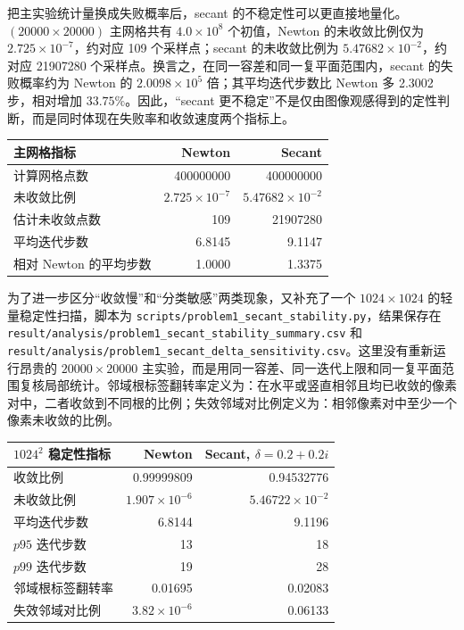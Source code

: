 \documentclass[12pt,a4paper,fontset=none]{ctexart}
\newcommand{\fileinline}[1]{{\urlstyle{same}\nolinkurl{#1}}}
\newcounter{none}
\newif\ifwidetable
\begin{document}
把主实验统计量换成失败概率后，secant 的不稳定性可以更直接地量化。\((20000\times 20000)\) 主网格共有 \(4.0\times 10^8\) 个初值，Newton 的未收敛比例仅为 \(2.725\times 10^{-7}\)，约对应 109 个采样点；secant 的未收敛比例为 \(5.47682\times 10^{-2}\)，约对应 21907280 个采样点。换言之，在同一容差和同一复平面范围内，secant 的失败概率约为 Newton 的 \(2.0098\times 10^5\) 倍；其平均迭代步数比 Newton 多 2.3002 步，相对增加 \(33.75\%\)。因此，``secant 更不稳定''不是仅由图像观感得到的定性判断，而是同时体现在失败率和收敛速度两个指标上。

{\def\LTcaptype{none} %
\begin{longtable}[]{@{}lrr@{}}
\toprule\noalign{}
主网格指标 & Newton & Secant \\
\midrule\noalign{}
\endhead
\bottomrule\noalign{}
\endlastfoot
计算网格点数 & 400000000 & 400000000 \\
未收敛比例 & \(2.725\times 10^{-7}\) & \(5.47682\times 10^{-2}\) \\
估计未收敛点数 & 109 & 21907280 \\
平均迭代步数 & 6.8145 & 9.1147 \\
相对 Newton 的平均步数 & 1.0000 & 1.3375 \\
\end{longtable}
}

为了进一步区分``收敛慢''和``分类敏感''两类现象，又补充了一个 \(1024\times 1024\) 的轻量稳定性扫描，脚本为 \fileinline{scripts/problem1_secant_stability.py}，结果保存在 \fileinline{result/analysis/problem1_secant_stability_summary.csv} 和 \fileinline{result/analysis/problem1_secant_delta_sensitivity.csv}。这里没有重新运行昂贵的 \(20000\times 20000\) 主实验，而是用同一容差、同一迭代上限和同一复平面范围复核局部统计。邻域根标签翻转率定义为：在水平或竖直相邻且均已收敛的像素对中，二者收敛到不同根的比例；失效邻域对比例定义为：相邻像素对中至少一个像素未收敛的比例。

{\def\LTcaptype{none} %
\widetabletrue
\begin{longtable}[]{@{}lrr@{}}
\toprule\noalign{}
\(1024^2\) 稳定性指标 & Newton & Secant, \(\delta=0.2+0.2i\) \\
\midrule\noalign{}
\endhead
\bottomrule\noalign{}
\endlastfoot
收敛比例 & 0.99999809 & 0.94532776 \\
未收敛比例 & \(1.907\times 10^{-6}\) & \(5.46722\times 10^{-2}\) \\
平均迭代步数 & 6.8144 & 9.1196 \\
\(p95\) 迭代步数 & 13 & 18 \\
\(p99\) 迭代步数 & 19 & 28 \\
邻域根标签翻转率 & 0.01695 & 0.02083 \\
失效邻域对比例 & \(3.82\times 10^{-6}\) & 0.06133 \\
\end{longtable}
}
\end{document}
